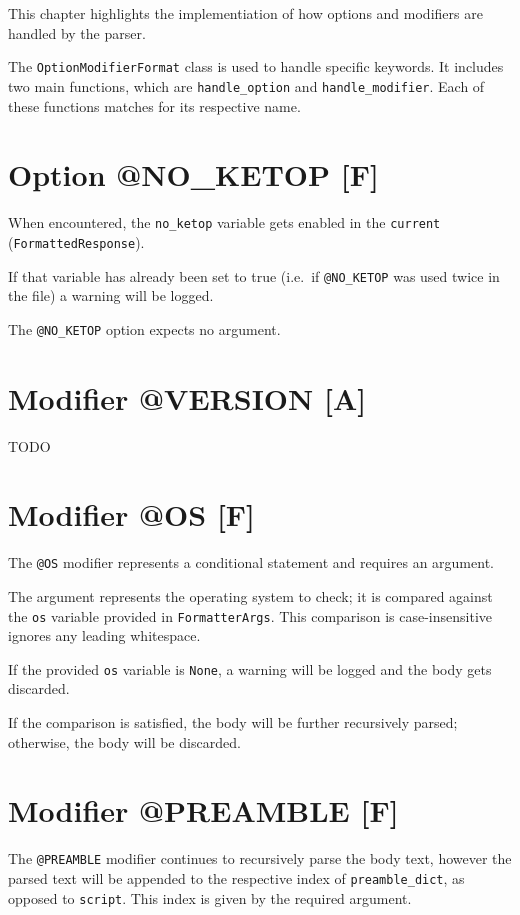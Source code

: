 This chapter highlights the implementiation of how options and modifiers are handled by the parser. 

The \verb|OptionModifierFormat| class is used to handle specific keywords. It includes two main functions, which are \verb|handle_option| and \verb|handle_modifier|. Each of these functions matches for its respective name. 

\section{Option @NO\_KETOP [F]}

When encountered, the \verb|no_ketop| variable gets enabled in the \verb|current| \\(\verb|FormattedResponse|).

If that variable has already been set to true (i.e.\ if \verb|@NO_KETOP| was used twice in the file) a warning will be logged.

The \verb|@NO_KETOP| option expects no argument. 

\section{Modifier @VERSION [A]}

TODO

\section{Modifier @OS [F]}

The \verb|@OS| modifier represents a conditional statement and requires an argument. 

The argument represents the operating system to check; it is compared against the \verb|os| variable provided in \verb|FormatterArgs|. This comparison is case-insensitive ignores any leading whitespace. 

If the provided \verb|os| variable is \verb|None|, a warning will be logged and the body gets discarded. 

If the comparison is satisfied, the body will be further recursively parsed; otherwise, the body will be discarded.

\section{Modifier @PREAMBLE [F]} 

The \verb|@PREAMBLE| modifier continues to recursively parse the body text, however the parsed text will be appended to the respective index of \verb|preamble_dict|, as opposed to \verb|script|. This index is given by the required argument.

